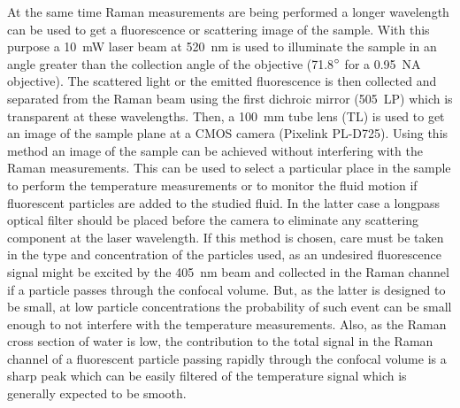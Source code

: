 \documentclass[twocolumn]{svjour3}       %
\begin{document}
\begin{figure}[h!]
\end{figure}

 At the same time Raman measurements are being performed a longer wavelength can be used to get a fluorescence or scattering image of the sample. With this purpose a 10~mW laser beam at 520~nm is used to illuminate the sample in an angle greater than the collection angle of the objective (71.8$\degree$ for a 0.95~NA objective). The scattered light or the emitted fluorescence is then collected and separated from the Raman beam using the first dichroic mirror (505~LP) which is transparent at these wavelengths. Then, a 100~mm tube lens (TL) is used to get an image of the sample plane at a CMOS camera (Pixelink PL-D725). Using this method an image of the sample can be achieved without interfering with the Raman measurements. This can be used to select a particular place in the sample to perform the temperature measurements or to monitor the fluid motion if fluorescent particles are added to the studied fluid. In the latter case a longpass optical filter should be placed before the camera to eliminate any scattering component at the laser wavelength. If this method is chosen, care must be taken in the type and concentration of the particles used, as an undesired fluorescence signal might be excited by the 405~nm beam and collected in the Raman channel if a particle passes through the confocal volume. But, as the latter is designed to be small, at low particle concentrations the probability of such event can be small enough to not interfere with the temperature measurements. Also, as the Raman cross section of water is low, the contribution to the total signal in the Raman channel of a fluorescent particle passing rapidly through the confocal volume is a sharp peak which can be easily filtered of the temperature signal which is generally expected to be smooth. 
 
\end{document}
